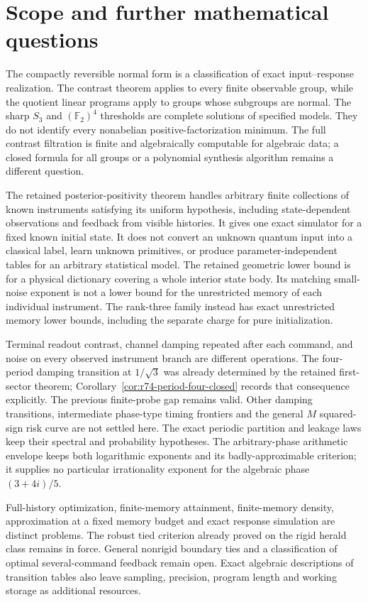 \section{Scope and further mathematical questions}\label{sec:r73-scope}\label{sec:r74-scope}
The compactly reversible normal form is a classification of exact
input--response realization. The contrast theorem applies to every finite
observable group, while the quotient linear programs apply to groups whose
subgroups are normal. The sharp $S_3$ and $(\mathbb F_2)^4$ thresholds are
complete solutions of specified models. They do not identify every
nonabelian positive-factorization minimum. The full contrast filtration is
finite and algebraically computable for algebraic data; a closed formula
for all groups or a polynomial synthesis algorithm remains a different
question.

The retained posterior-positivity theorem handles arbitrary finite collections of
known instruments satisfying its uniform hypothesis, including
state-dependent observations and feedback from visible histories. It gives
one exact simulator for a fixed known initial state. It does not convert an
unknown quantum input into a classical label, learn unknown primitives, or
produce parameter-independent tables for an arbitrary statistical model.
The retained geometric lower bound is for a physical dictionary
covering a whole interior state body. Its matching small-noise exponent is
not a lower bound for the unrestricted memory of each individual instrument.
The rank-three family instead has exact unrestricted memory lower bounds,
including the separate charge for pure initialization.

Terminal readout contrast, channel damping repeated after each command,
and noise on every observed instrument branch are different operations.
The four-period damping transition at $1/\sqrt3$ was already determined by
the retained first-sector theorem; Corollary~\ref{cor:r74-period-four-closed}
records that consequence explicitly. The previous finite-probe gap remains
valid. Other damping transitions, intermediate phase-type timing frontiers
and the general $M$ squared-sign risk curve are not settled here. The exact
periodic partition and leakage laws keep their spectral and probability
hypotheses. The arbitrary-phase arithmetic envelope keeps both logarithmic
exponents and its badly-approximable criterion; it supplies no particular
irrationality exponent for the algebraic phase $(3+4i)/5$.

Full-history optimization, finite-memory attainment, finite-memory density,
approximation at a fixed memory budget and exact response simulation are
distinct problems. The robust tied criterion already proved on the rigid
herald class remains in force. General nonrigid boundary ties and a
classification of optimal several-command feedback remain open. Exact
algebraic descriptions of transition tables also leave sampling, precision,
program length and working storage as additional resources.

